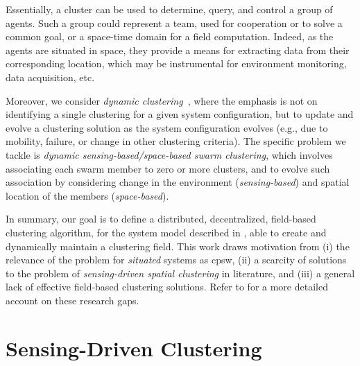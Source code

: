 Essentially, a cluster can be used to determine, query, and control a group of agents.
%
Such a group could represent a team, used for cooperation or to solve a common goal,
 or a space-time domain for a field computation.
%
Indeed, as the agents are situated in space,
 they provide a means for extracting data
 from their corresponding location,
 which may be instrumental for environment monitoring,
 data acquisition, etc.

Moreover, we consider \emph{dynamic clustering}~\cite{DBLP:journals/pr/RoaTG19},
 where the emphasis is not on identifying a single clustering
 for a given system configuration,
 but to update and evolve a clustering solution
 as the system configuration evolves
 (e.g., due to mobility, failure, or change in other clustering criteria).
%
The specific problem we tackle is \emph{dynamic sensing-based/space-based swarm clustering},
 which involves associating each swarm member
 to zero or more clusters, and to evolve such association by considering change in the environment (\emph{sensing-based}) and spatial location of the members (\emph{space-based}).
%

In summary, our goal is to define a distributed, decentralized, field-based
 clustering algorithm,
 for the system model described in ,
 able to create and dynamically maintain a clustering field.
%
%
%
This work draws motivation
 from
 (i) the relevance of the problem for \emph{situated} systems as \ac{cpsw},
 (ii) a scarcity of solutions to the problem of \emph{sensing-driven spatial clustering} in literature,
 and
 (iii) a general lack of effective field-based clustering solutions.
%
Refer to  for a more detailed account on these research gaps.


\section{Sensing-Driven Clustering}
\label{s:contrib}

